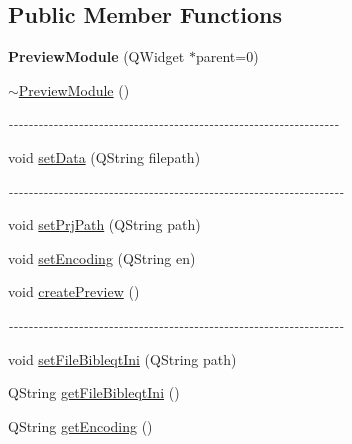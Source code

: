 \subsection*{Public Member Functions}
\begin{DoxyCompactItemize}
\item 
\hypertarget{classPreviewModule_ad35ea0c869e56672dd8191c8ca722665}{
{\bfseries PreviewModule} (QWidget $\ast$parent=0)}
\label{classPreviewModule_ad35ea0c869e56672dd8191c8ca722665}

\item 
\hypertarget{classPreviewModule_a4d070fb2a68329bc4531f6a18101413c}{
\hyperlink{classPreviewModule_a4d070fb2a68329bc4531f6a18101413c}{$\sim$PreviewModule} ()}
\label{classPreviewModule_a4d070fb2a68329bc4531f6a18101413c}

\begin{DoxyCompactList}\small\item\em -\/-\/-\/-\/-\/-\/-\/-\/-\/-\/-\/-\/-\/-\/-\/-\/-\/-\/-\/-\/-\/-\/-\/-\/-\/-\/-\/-\/-\/-\/-\/-\/-\/-\/-\/-\/-\/-\/-\/-\/-\/-\/-\/-\/-\/-\/-\/-\/-\/-\/-\/-\/-\/-\/-\/-\/-\/-\/-\/-\/-\/-\/-\/-\/-\/-\/ \item\end{DoxyCompactList}\item 
void \hyperlink{classPreviewModule_ade5f414970261390f2e25f24f298dbb8}{setData} (QString filepath)
\begin{DoxyCompactList}\small\item\em -\/-\/-\/-\/-\/-\/-\/-\/-\/-\/-\/-\/-\/-\/-\/-\/-\/-\/-\/-\/-\/-\/-\/-\/-\/-\/-\/-\/-\/-\/-\/-\/-\/-\/-\/-\/-\/-\/-\/-\/-\/-\/-\/-\/-\/-\/-\/-\/-\/-\/-\/-\/-\/-\/-\/-\/-\/-\/-\/-\/-\/-\/-\/-\/-\/-\/-\/ \item\end{DoxyCompactList}\item 
void \hyperlink{classPreviewModule_add4a7eb3532510ee1a8a68f6031a7f65}{setPrjPath} (QString path)
\item 
void \hyperlink{classPreviewModule_a6f9d781b4e6324b9df4edee890b9a017}{setEncoding} (QString en)
\item 
void \hyperlink{classPreviewModule_aea62106110fc3ff8d08d5fb93ee2c037}{createPreview} ()
\begin{DoxyCompactList}\small\item\em -\/-\/-\/-\/-\/-\/-\/-\/-\/-\/-\/-\/-\/-\/-\/-\/-\/-\/-\/-\/-\/-\/-\/-\/-\/-\/-\/-\/-\/-\/-\/-\/-\/-\/-\/-\/-\/-\/-\/-\/-\/-\/-\/-\/-\/-\/-\/-\/-\/-\/-\/-\/-\/-\/-\/-\/-\/-\/-\/-\/-\/-\/-\/-\/-\/-\/-\/ \item\end{DoxyCompactList}\item 
void \hyperlink{classPreviewModule_a7d4a1578982f6940df9d6641f2d4a105}{setFileBibleqtIni} (QString path)
\item 
QString \hyperlink{classPreviewModule_a6b68d6368a766d0ac50fff8f37bb7026}{getFileBibleqtIni} ()
\item 
QString \hyperlink{classPreviewModule_a35f297ef0e500ea543cab31fd3c80dbe}{getEncoding} ()
\end{DoxyCompactItemize}


